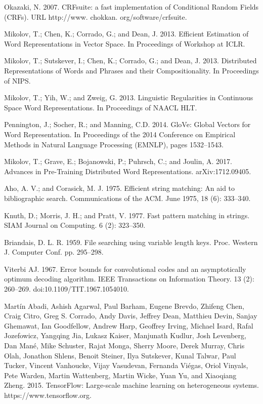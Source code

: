 \documentclass[letterpaper]{article} %
\begin{document}
\smallskip \noindent
Okazaki, N. 2007. CRFsuite: a fast implementation of Conditional Random Fields (CRFs). URL http://www. chokkan. org/software/crfsuite. 

\smallskip \noindent
Mikolov, T.; Chen, K.; Corrado, G.; and Dean, J. 2013. Efficient Estimation of Word Representations in Vector Space. In Proceedings of Workshop at ICLR. 

\smallskip \noindent
Mikolov, T.; Sutskever, I.; Chen, K.; Corrado, G.; and Dean, J. 2013. Distributed Representations of Words and Phrases and their Compositionality. In Proceedings of NIPS. 

\smallskip \noindent
Mikolov, T.; Yih, W.; and Zweig, G. 2013. Linguistic Regularities in Continuous Space Word Representations. In Proceedings of NAACL HLT. 

\smallskip \noindent
Pennington, J.; Socher, R.; and Manning, C.D. 2014. GloVe: Global Vectors for Word Representation. In Proceedings of the 2014 Conference on Empirical Methods in Natural Language Processing (EMNLP), pages 1532–1543. 

\smallskip \noindent
Mikolov, T.; Grave, E.; Bojanowski, P.; Puhrsch, C.; and Joulin, A. 2017. Advances in Pre-Training Distributed Word Representations. arXiv:1712.09405. 

\smallskip \noindent
Aho, A. V.; and Corasick, M. J. 1975. Efficient string matching: An aid to bibliographic search. Communications of the ACM. June 1975, 18 (6): 333–340.

\smallskip \noindent
Knuth, D.; Morris, J. H.; and Pratt, V. 1977. Fast pattern matching in strings. SIAM Journal on Computing. 6 (2): 323–350. 

\smallskip \noindent
Briandais, D. L. R. 1959. File searching using variable length keys. Proc. Western J. Computer Conf. pp. 295–298. 

\smallskip \noindent
Viterbi AJ. 1967. Error bounds for convolutional codes and an asymptotically optimum decoding algorithm. IEEE Transactions on Information Theory. 13 (2): 260–269. doi:10.1109/TIT.1967.1054010. 

\smallskip \noindent
Martín Abadi, Ashish Agarwal, Paul Barham, Eugene Brevdo, Zhifeng Chen, Craig Citro, Greg S. Corrado, Andy Davis, Jeffrey Dean, Matthieu Devin, Sanjay Ghemawat, Ian Goodfellow, Andrew Harp, Geoffrey Irving, Michael Isard, Rafal Jozefowicz, Yangqing Jia, Lukasz Kaiser, Manjunath Kudlur, Josh Levenberg, Dan Mané, Mike Schuster, Rajat Monga, Sherry Moore, Derek Murray, Chris Olah, Jonathon Shlens, Benoit Steiner, Ilya Sutskever, Kunal Talwar, Paul Tucker, Vincent Vanhoucke, Vijay Vasudevan, Fernanda Viégas, Oriol Vinyals, Pete Warden, Martin Wattenberg, Martin Wicke, Yuan Yu, and Xiaoqiang Zheng. 2015. TensorFlow: Large-scale machine learning on heterogeneous systems. https://www.tensorflow.org.
\end{document}

